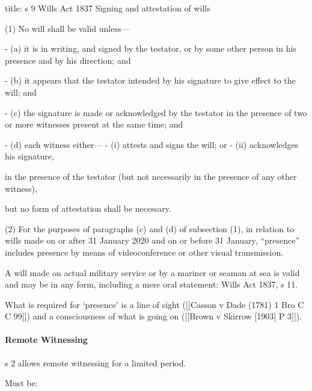 \documentclass[
]{article}
\newenvironment{Shaded}{}{}
\newcommand{\NormalTok}[1]{#1}
\begin{document}
\begin{Shaded}
\begin{Highlighting}[]
\NormalTok{title: s 9 Wills Act 1837}
\NormalTok{Signing and attestation of wills}

\NormalTok{(1) No will shall be valid unless—}

\NormalTok{{-} (a) it is in writing, and signed by the testator, or by some other person in his presence and by his direction; and}

\NormalTok{{-} (b) it appears that the testator intended by his signature to give effect to the will; and}

\NormalTok{{-} (c) the signature is made or acknowledged by the testator in the presence of two or more witnesses present at the same time; and}

\NormalTok{{-} (d) each witness either—}
\NormalTok{    {-} (i) attests and signs the will; or}
\NormalTok{    {-} (ii) acknowledges his signature,}

\NormalTok{    in the presence of the testator (but not necessarily in the presence of any other witness),}

\NormalTok{but no form of attestation shall be necessary.}

\NormalTok{(2) For the purposes of paragraphs (c) and (d) of subsection (1), in relation to wills made on or after 31 January 2020 and on or before 31 January, “presence” includes presence by means of videoconference or other visual transmission.}
\end{Highlighting}
\end{Shaded}

A will made on actual military service or by a mariner or seaman at sea
is valid and may be in any form, including a mere oral statement: Wills
Act 1837, s 11.

What is required for `presence' is a line of sight ({[}{[}Casson v Dade
(1781) 1 Bro C C 99{]}{]}) and a consciousness of what is going on
({[}{[}Brown v Skirrow {[}1903{]} P 3{]}{]}).

\hypertarget{remote-witnessing}{%
\paragraph{Remote Witnessing}\label{remote-witnessing}}

s 2 allows remote witnessing for a limited period.

Must be:
\end{document}

